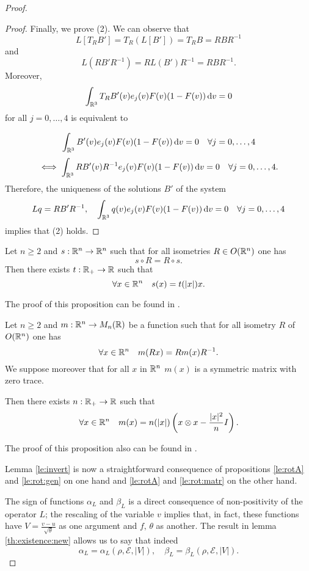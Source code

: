\begin{subappendices}
\begin{proof}
\begin{proof}
Finally, we prove (2). We can observe that
\[L[T_RB']=T_R(L[B'])=T_RB=RBR^{-1}\]
and
\[L(RB'R^{-1})=RL(B')R^{-1}=RBR^{-1}.\]
Moreover, 
\[\int_{{\mathbb {R}^3}}T_RB'(v)e_j(v)F(v)(1-F(v)){\,\mathrm{d} v}=0\]
for all $j=0,\ldots,4$ is equivalent to

\[\int_{{\mathbb {R}^3}} B'(v)e_j(v)F(v)(1-F(v)){\,\mathrm{d} v}=0\quad \forall j=0,\ldots,4\]
\[\iff \int_{{\mathbb {R}^3}} RB'(v)R^{-1}e_j(v)F(v)(1-F(v)){\,\mathrm{d} v}=0\quad \forall j=0,\ldots,4.\]
Therefore, the uniqueness of the solutions $B'$ of the system
\[Lq=RB'R^{-1}, \quad \int_{{\mathbb {R}^3}} q(v)e_j(v)F(v)(1-F(v)){\,\mathrm{d} v}=0\quad \forall j=0,\ldots,4\]
implies that (2) holds.
\end{proof}
\begin{proposition}\label{le:rot:gen}
Let $n\ge 2$ and $s:{\mathbb {R}^n}\to{\mathbb {R}^n}$ such that for all isometries $R\in O({\mathbb {R}^n})$
one has \[s\circ R=R\circ s.\]
Then there exists $t:{\mathbb {R}}_+\to {\mathbb {R}}$ such that 
\begin{equation}\label{eq:rot:gen}
\forall x\in {\mathbb {R}^n} \quad s(x)=t(|x|)x.	
\end{equation}
\end{proposition}
The proof of this proposition can be found in \cite{desvillettes1994remark}.
\begin{proposition}\label{le:rot:matr}
	Let $n\ge 2$ and $m:{\mathbb {R}^n} \to M_n({\mathbb {R}})$ be a function such that for all isometry $R$ of $O({\mathbb {R}^n})$ one has \[\forall x\in {\mathbb {R}^n}\quad m(Rx)=Rm(x)R^{-1}.\]
	We suppose moreover that for all $x$ in ${\mathbb {R}^n}$ $m(x)$ is a symmetric matrix with zero trace.

	Then there exists $n:{\mathbb {R}}_+\to{\mathbb {R}}$ such that
	\[\forall x\in {\mathbb {R}^n}\quad m(x)=n(|x|)\left(x\otimes x-\frac{|x|^2}{n}I\right).\]
	\end{proposition}
	The proof of this proposition also can be found in \cite{desvillettes1994remark}.

	Lemma \ref{le:invert} is now a straightforward consequence of propositions \ref{le:rotA} and \ref{le:rot:gen} on one hand and \ref{le:rotA} and \ref{le:rot:matr} on the other hand.

	The sign of functions $\alpha_L$ and $\beta_L$ is a direct consequence of non-positivity of the operator $L$; the rescaling of the variable $v$ implies that, in fact, these functions have $V=\frac{v-u}{\sqrt \theta} $ as one argument and $f,\,\theta$ as another. The result in lemma \ref{th:existence:new} allows us to say that indeed
	\[\alpha_L=\alpha_L(\rho,\mathcal E,|V|),\quad \beta_L=\beta_L(\rho,\mathcal E,|V|).\]
\end{proof}
\end{subappendices}
